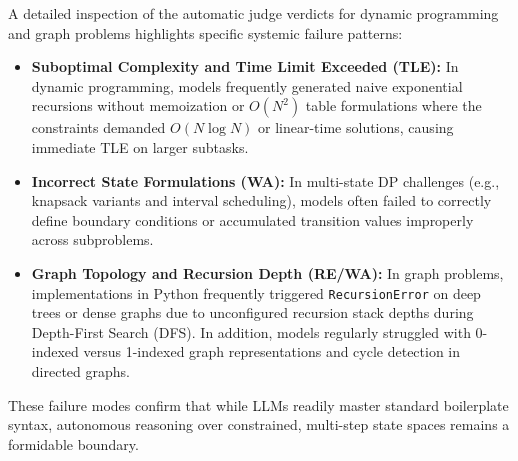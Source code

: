 \documentclass[conference]{IEEEtran}
\begin{document}
A detailed inspection of the automatic judge verdicts for dynamic programming and graph problems highlights specific systemic failure patterns:
\begin{itemize}
    \item \textbf{Suboptimal Complexity and Time Limit Exceeded (TLE):} In dynamic programming, models frequently generated naive exponential recursions without memoization or $O(N^2)$ table formulations where the constraints demanded $O(N \log N)$ or linear-time solutions, causing immediate TLE on larger subtasks.
    \item \textbf{Incorrect State Formulations (WA):} In multi-state DP challenges (e.g., knapsack variants and interval scheduling), models often failed to correctly define boundary conditions or accumulated transition values improperly across subproblems.
    \item \textbf{Graph Topology and Recursion Depth (RE/WA):} In graph problems, implementations in Python frequently triggered \texttt{RecursionError} on deep trees or dense graphs due to unconfigured recursion stack depths during Depth-First Search (DFS). In addition, models regularly struggled with 0-indexed versus 1-indexed graph representations and cycle detection in directed graphs.
\end{itemize}
These failure modes confirm that while LLMs readily master standard boilerplate syntax, autonomous reasoning over constrained, multi-step state spaces remains a formidable boundary.

\begin{table}[htbp]
\centering
\caption{Benchmarking LLM models solving questions}
\label{tab:tabela3}
\end{table}
\end{document}

